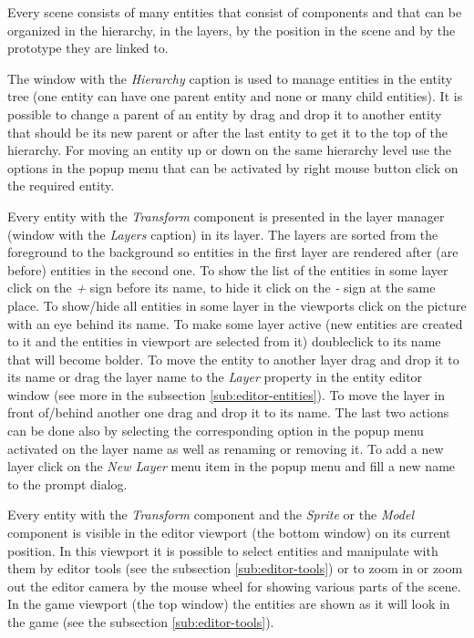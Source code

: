 Every scene consists of many entities that consist of components and that can be organized in the hierarchy, in the layers, by the position in the scene and by the prototype they are linked to.

The window with the \emph{Hierarchy} caption is used to manage entities in the entity tree (one entity can have one parent entity and none or many child entities). It is possible to change a parent of an entity by drag and drop it to another entity that should be its new parent or after the last entity to get it to the top of the hierarchy. For moving an entity up or down on the same hierarchy level use the options in the popup menu that can be activated by right mouse button click on the required entity.

Every entity with the \emph{Transform} component is presented in the layer manager (window with the \emph{Layers} caption) in its layer. The layers are sorted from the foreground to the background so entities in the first layer are rendered after (are before) entities in the second one. To show the list of the entities in some layer click on the \emph{+} sign before its name, to hide it click on the \emph{-} sign at the same place. To show/hide all entities in some layer in the viewports click on the picture with an eye behind its name. To make some layer active (new entities are created to it and the entities in viewport are selected from it) doubleclick to its name that will become bolder. To move the entity to another layer drag and drop it to its name or drag the layer name to the \emph{Layer} property in the entity editor window (see more in the subsection \ref{sub:editor-entities}). To move the layer in front of/behind another one drag and drop it to its name. The last two actions can be done also by selecting the corresponding option in the popup menu activated on the layer name as well as renaming or removing it. To add a new layer click on the \emph{New Layer} menu item in the popup menu and fill a new name to the prompt dialog.

Every entity with the \emph{Transform} component and the \emph{Sprite} or the \emph{Model} component is visible in the editor viewport (the bottom window) on its current position. In this viewport it is possible to select entities and manipulate with them by editor tools (see the subsection \ref{sub:editor-tools}) or to zoom in or zoom out the editor camera by the mouse wheel for showing various parts of the scene. In the game viewport (the top window) the entities are shown as it will look in the game (see the subsection \ref{sub:editor-tools}).

